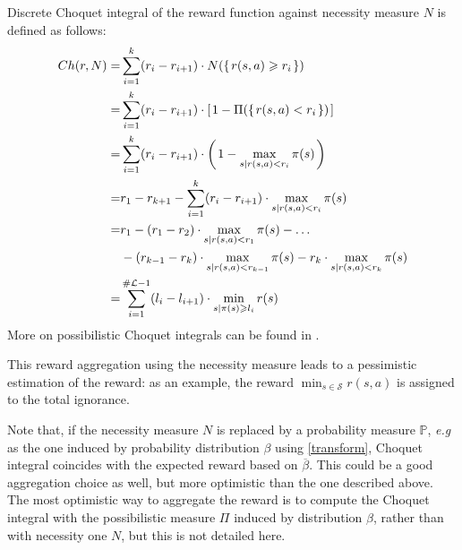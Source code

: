 Discrete Choquet integral of the reward function against necessity measure $N$ \cite{DBLP:conf/ipmu/AmorFG10} is defined as follows:
\begin{eqnarray}
\label{choquet1}  Ch(r,N) = & \displaystyle \sum_{i=1}^{k} (r_i - r_{i+1}) \cdot N( \left\{ \left. r(s,a) \geqslant r_i \right. \right\}) \\
\nonumber = & \displaystyle \sum_{i=1}^{k} (r_i - r_{i+1}) \cdot \left[ \left. 1 - \Pi( \left\{ \left. r(s,a) < r_i \right. \right\})  \right. \right] \\ 
\nonumber = & \displaystyle \sum_{i=1}^{k} (r_i - r_{i+1}) \cdot \left( \left. 1 - \max_{s | r(s,a)<r_i} \pi(s) \right. \right) \\ 
\nonumber = & \displaystyle r_1 - r_{k+1} - \sum_{i=1}^{k} (r_i - r_{i+1}) \cdot \max_{s | r(s,a)<r_i} \pi(s) \\
\nonumber = & \displaystyle r_1 - (r_1 - r_2) \cdot \max_{s | r(s,a)<r_1} \pi(s) - \ldots \\
\nonumber & \displaystyle - (r_{k-1} - r_{k}) \cdot \max_{s | r(s,a)<r_{k-1}} \pi(s) - r_k \cdot \max_{s | r(s,a) < r_k} \pi(s) \\
\label{choquet2} = & \displaystyle \sum_{i=1}^{\# \mathcal{L}-1} (l_i - l_{i+1}) \cdot \min_{s | \pi(s) \geqslant l_i } r(s)  
\end{eqnarray}
More on possibilistic Choquet integrals can be found in \cite{DBLP:journals/amai/Cooman01,DuPr2002.20}.

This reward aggregation using the necessity measure leads to a pessimistic estimation of the reward:
as an example, the reward $\displaystyle \min_{s \in \mathcal{S}} r(s,a)$ is assigned to the total ignorance.  

Note that, if the necessity measure $N$ is replaced by a probability measure $\mathbb{P}$, 
\textit{e.g} as the one induced by probability distribution $\beta$ using \ref{transform}, 
Choquet integral coincides with the expected reward based on $\overline{\beta}$.
This could be a good aggregation choice as well, but more optimistic than the one described above.
The most optimistic way to aggregate the reward  
is to compute the Choquet integral with the possibilistic
measure $\Pi$ induced by distribution $\beta$, rather than with
necessity one $N$, but this is not detailed here.

